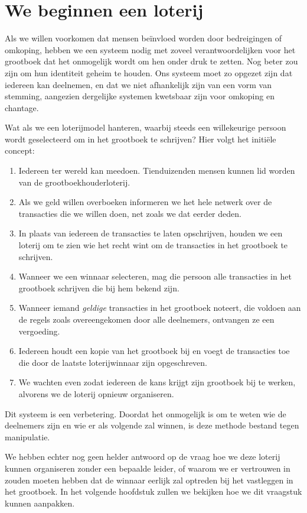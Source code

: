 \section{We beginnen een loterij}

Als we willen voorkomen dat mensen beïnvloed worden door bedreigingen of omkoping, hebben we een systeem nodig met zoveel verantwoordelijken voor het grootboek dat het onmogelijk wordt om hen onder druk te zetten. Nog beter zou zijn om hun identiteit geheim te houden. Ons systeem moet zo opgezet zijn dat iedereen kan deelnemen, en dat we niet afhankelijk zijn van een vorm van stemming, aangezien dergelijke systemen kwetsbaar zijn voor omkoping en chantage.

Wat als we een loterijmodel hanteren, waarbij steeds een willekeurige persoon wordt geselecteerd om in het grootboek te schrijven? Hier volgt het initiële concept:

\begin{enumerate}
    \item Iedereen ter wereld kan meedoen. Tienduizenden mensen kunnen lid worden van de grootboekhouderloterij.
    \item Als we geld willen overboeken informeren we het hele netwerk over de transacties die we willen doen, net zoals we dat eerder deden.
    \item In plaats van iedereen de transacties te laten opschrijven, houden we een loterij om te zien wie het recht wint om de transacties in het grootboek te schrijven.
    \item Wanneer we een winnaar selecteren, mag die persoon alle transacties in het grootboek schrijven die bij hem bekend zijn.
    \item Wanneer iemand \textit{geldige} transacties in het grootboek noteert, die voldoen aan de regels zoals overeengekomen door alle deelnemers, ontvangen ze een vergoeding.
    \item Iedereen houdt een kopie van het grootboek bij en voegt de transacties toe die door de laatste loterijwinnaar zijn opgeschreven.
    \item We wachten even zodat iedereen de kans krijgt zijn grootboek bij te werken, alvorens we de loterij opnieuw organiseren.
\end{enumerate}

Dit systeem is een verbetering. Doordat het onmogelijk is om te weten wie de deelnemers zijn en wie er als volgende zal winnen, is deze methode bestand tegen manipulatie.

We hebben echter nog geen helder antwoord op de vraag hoe we deze loterij kunnen organiseren zonder een bepaalde leider, of waarom we er vertrouwen in zouden moeten hebben dat de winnaar eerlijk zal optreden bij het vastleggen in het grootboek. In het volgende hoofdstuk zullen we bekijken hoe we dit vraagstuk kunnen aanpakken.
